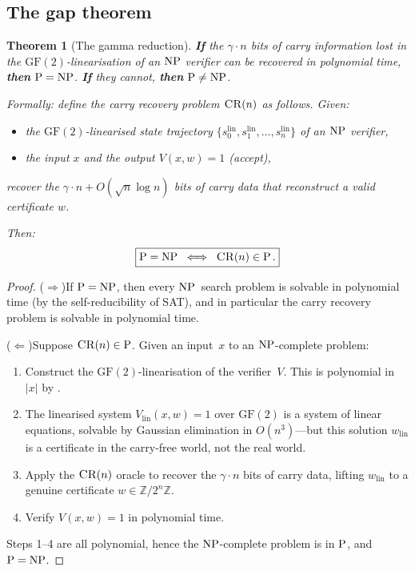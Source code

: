 \documentclass[12pt, a4paper]{article}
\theoremstyle{plain}
\newtheorem{theorem}{Theorem}[section]
\theoremstyle{definition}
\theoremstyle{remark}
\newcommand{\Z}{\mathbb{Z}}
\newcommand{\GF}{\mathrm{GF}}
\newcommand{\NP}{\textup{NP}}
\newcommand{\PP}{\textup{P}}
\begin{document}
\subsection{The gap theorem}

\begin{theorem}[The gamma reduction]\label{thm:main}
\textbf{If} the $\gamma \cdot n$ bits of carry information lost in the
$\GF(2)$-linearisation of an $\NP$ verifier can be recovered in
polynomial time, \textbf{then} $\PP = \NP$.  \textbf{If} they cannot,
\textbf{then} $\PP \neq \NP$.

Formally: define the \emph{carry recovery problem} $\textsc{CR}(n)$ as
follows.  Given:
\begin{itemize}[nosep]
  \item the $\GF(2)$-linearised state trajectory
        $\{s_0^{\text{lin}}, s_1^{\text{lin}}, \ldots, s_n^{\text{lin}}\}$
        of an $\NP$ verifier,
  \item the input $x$ and the output $V(x, w) = 1$ (accept),
\end{itemize}
recover the $\gamma \cdot n + O(\sqrt{n}\log n)$ bits of carry data
that reconstruct a valid certificate $w$.

Then:
\begin{equation}\label{eq:reduction}
  \boxed{%
    \PP = \NP
    \;\;\Longleftrightarrow\;\;
    \textsc{CR}(n) \in \PP\,.
  }
\end{equation}
\end{theorem}

\begin{proof}
($\Rightarrow$)\quad If $\PP = \NP$, then every $\NP$~search problem
is solvable in polynomial time (by the self-reducibility of SAT), and
in particular the carry recovery problem is solvable in polynomial
time.

($\Leftarrow$)\quad Suppose $\textsc{CR}(n) \in \PP$.  Given an
input~$x$ to an $\NP$-complete problem:
\begin{enumerate}[nosep]
  \item Construct the $\GF(2)$-linearisation of the verifier~$V$.
        This is polynomial in $|x|$ by .
  \item The linearised system $V_{\text{lin}}(x, w) = 1$ over $\GF(2)$
        is a system of linear equations, solvable by Gaussian
        elimination in $O(n^3)$---but this solution $w_{\text{lin}}$
        is a certificate in the carry-free world, not the real world.
  \item Apply the $\textsc{CR}(n)$ oracle to recover the
        $\gamma \cdot n$ bits of carry data, lifting
        $w_{\text{lin}}$ to a genuine certificate $w \in \Z/2^n\Z$.
  \item Verify $V(x, w) = 1$ in polynomial time.
\end{enumerate}
Steps 1--4 are all polynomial, hence the $\NP$-complete problem is in
$\PP$, and $\PP = \NP$.
\end{proof}
\end{document}
